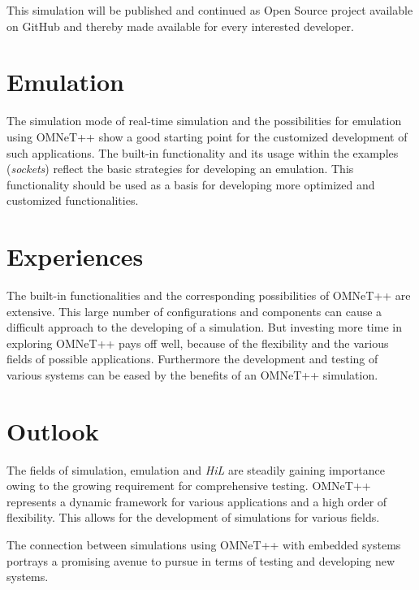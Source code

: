 This simulation will be published and continued as Open Source project available on GitHub \cite{openautomationtechnologies_openpowerlink_omnetpp} and thereby made available for every interested developer.

\section{Emulation}
\label{sec:conclusion_emulation}
The simulation mode of real-time simulation and the possibilities for emulation using OMNeT++  show a good starting point for the customized development of such applications.
The built-in functionality and its usage within the examples (\emph{sockets}) reflect the basic strategies for developing an emulation.
This functionality should be used as a basis for developing more optimized and customized functionalities.

\section{Experiences}
\label{sec:conclusion_experiences}
The built-in functionalities and the corresponding possibilities of OMNeT++ are extensive.
This large number of configurations and components can cause a difficult approach to the developing of a simulation.
But investing more time in exploring OMNeT++ pays off well, because of the flexibility and the various fields of possible applications.
Furthermore the development and testing of various systems can be eased by the benefits of an OMNeT++ simulation.

\section{Outlook}
\label{sec:conclusion_outlook}
The fields of simulation, emulation and \emph{HiL} are steadily gaining importance owing to the growing requirement for comprehensive testing.
OMNeT++ represents a dynamic framework for various applications and a high order of flexibility.
This allows for the development of simulations for various fields.

The connection between simulations using OMNeT++ with embedded systems portrays a promising avenue to pursue in terms of testing and developing new systems.